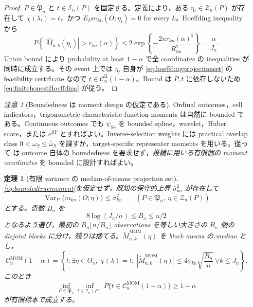 \documentclass[11pt,a4paper]{ltjsarticle}
\newtheorem{theorem}{定理}[section]
\theoremstyle{remark}
\newtheorem{remark}{注意}[section]
\newcommand{\ii}{\mathrm i}
\newcommand{\wh}{\widehat}
\newcommand{\wt}{\widetilde}
\newcommand{\abs}[1]{\left|#1\right|}
\newcommand{\cC}{\mathcal C}
\newcommand{\cI}{\mathcal I}
\newcommand{\cZ}{\mathcal Z}
\newcommand{\Var}{\operatorname{Var}}
\begin{document}
\begin{proof}
$P\in\mathfrak P_n$ と $t\in\cI_n(P)$ を固定する。定義により，ある $\eta_t\in\cZ_n(P)$ が存在して $\chi(\lambda_t)=t$，かつ $E_Pm_{kn}(O;\eta_t)=0$ for every $k$。Hoeffding inequality から
\[
P\left\{\abs{\wh M_{n,k}(\eta_t)}>r_{kn}(\alpha)\right\}
\le2\exp\left\{-\frac{2nr_{kn}(\alpha)^2}{R_{kn}^2}\right\}
=\frac{\alpha}{J_n}.
\]
Union bound により probability at least $1-\alpha$ で全 coordinates の inequalities が同時に成立する。その event 上では $\eta_t$ 自身が \eqref{eq:hoeffdingprojectionset} の feasibility certificate なので $t\in\cC_n^{\mathrm H}(1-\alpha)$。Bound は $P,t$ に依存しないため \eqref{eq:finitehonestHoeffding} が従う。
\end{proof}

\begin{remark}[Boundedness は moment design の仮定である]\label{rem:boundedmomentdesign}
Ordinal outcomes，cell indicators，trigonometric characteristic-function moments は自然に bounded である。Continuous outcomes でも $\psi_{Sr}$ を bounded spline，wavelet，Huber score，または $e^{\ii tY}$ とすればよい。Inverse-selection weights には practical overlap class $0<\omega_S\le\bar\omega_S$ を課すか，target-specific representer moments を用いる。従って  は outcome 自体の boundedness を要求せず，\emph{推論に用いる有限個の moment coordinates} を bounded に設計すればよい。
\end{remark}

\begin{theorem}[有限 variance の median-of-means projection set]\label{thm:momprojection}
\eqref{eq:boundedtruemoment}を仮定せず，既知の保守的上界 $\bar\sigma_{kn}^2$ が存在して
\begin{equation}
\Var_P\{m_{kn}(O;\eta)\}\le\bar\sigma_{kn}^2
\qquad
(P\in\mathfrak P_n,\ \eta\in\cZ_n(P))
\label{eq:MOMvariancebound}
\end{equation}
とする。奇数 $B_n$ を
\[
8\log(J_n/\alpha)\le B_n\le n/2
\]
となるよう選び，最初の $B_n\lfloor n/B_n\rfloor$ observations を等しい大きさの $B_n$ 個の disjoint blocks に分け，残りは捨てる。$\wt M_{n,k}^{\mathrm{MOM}}(\eta)$ を block means の median とし，
\begin{equation}
\cC^{\mathrm{MOM}}_{n}(1-\alpha)
=\left\{t:\exists\eta\in\Theta_n,\ \chi(\lambda)=t,
\ \abs{\wt M_{n,k}^{\mathrm{MOM}}(\eta)}
\le4\bar\sigma_{kn}\sqrt{\frac{B_n}{n}}
\ \forall k\le J_n
\right\}.
\label{eq:MOMprojectionset}
\end{equation}
このとき
\begin{equation}
\inf_{P\in\mathfrak P_n}
\inf_{t\in\cI_n(P)}
P\{t\in\cC^{\mathrm{MOM}}_{n}(1-\alpha)\}
\ge1-\alpha
\label{eq:finitehonestMOM}
\end{equation}
が有限標本で成立する。
\end{theorem}
\end{document}
